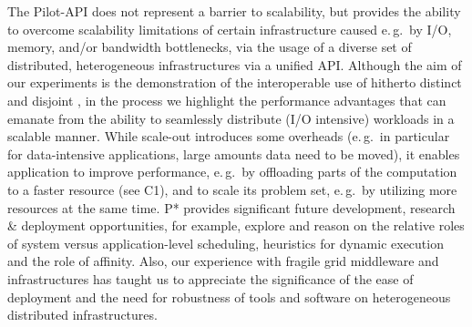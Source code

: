 \documentclass[conference]{IEEEtran}
\begin{document}
The Pilot-API does not represent a barrier to scalability, but
provides the ability to overcome scalability limitations of certain
infrastructure caused e.\,g.\ by I/O, memory, and/or bandwidth
bottlenecks, via the usage of a diverse set of distributed,
heterogeneous infrastructures via a unified API.  Although the aim of
our experiments is the demonstration of the interoperable use of
hitherto distinct and disjoint \pilotjobs, in the process we highlight
the performance advantages that can emanate from the ability to
seamlessly distribute (I/O intensive) workloads in a scalable manner.
While scale-out introduces some overheads (e.\,g.\ in particular for
data-intensive applications, large amounts data need to be moved), it
enables application to improve performance, e.\,g.\ by offloading
parts of the computation to a faster resource (see C1), and to scale
its problem set, e.\,g.\ by utilizing more resources at the same time.
P* provides significant future development, research \& deployment
opportunities, for example, explore and reason on the relative roles
of system versus application-level scheduling, heuristics for dynamic
execution and the role of affinity.  Also, our experience with fragile
grid middleware and infrastructures has taught us to appreciate the
significance of the ease of deployment and the need for robustness of
tools and software on heterogeneous distributed infrastructures. 


\end{document}

